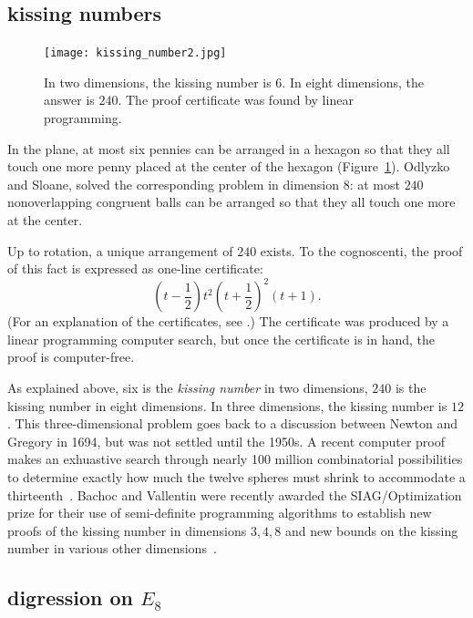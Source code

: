 \documentclass{llncs}
\begin{document}
\subsection{kissing numbers} %


\begin{figure}[h!]
  \centering
\texttt{[image: kissing\_number2.jpg]}
  \caption{In two dimensions, the kissing number is $6$. In eight dimensions, the answer is $240$.
   The proof certificate was found by linear programming.}
\label{fig:kissing}
\end{figure}


In the plane, at most six pennies can be arranged in a hexagon so that they
all touch one more penny placed at the center of the hexagon (Figure~\ref{fig:kissing}).  Odlyzko
and Sloane, solved the corresponding problem in dimension $8$: at most
$240$ nonoverlapping congruent balls can be arranged so that they all
touch one more at the center.  

 Up to rotation, a unique arrangement of
$240$ exists.  To the cognoscenti, the proof of this fact is expressed as one-line certificate:
\[
(t - \frac{1}{2})t^2(t + \frac{1}{2})^2 (t + 1).
\]
(For an explanation of the certificates, see \cite{PZ}.)
The certificate was produced by a linear programming computer search, but once
the certificate is in hand, the proof is computer-free.

As explained above, six is the {\it kissing number} in two dimensions,
$240$ is the kissing number in eight dimensions. In three dimensions,
the kissing number is $12$.  This three-dimensional problem goes back
to a discussion between Newton and Gregory in 1694, but was not
settled until the 1950s.  A recent computer proof makes an exhuastive
search through nearly 100 million combinatorial possibilities to
determine exactly how much the twelve spheres must shrink to
accommodate a thirteenth~\cite{Musin-Tarasov}.  Bachoc and Vallentin
were recently awarded the SIAG/Optimization prize for their use of
semi-definite programming algorithms to establish new proofs of the
kissing number in dimensions $3,4,8$ and new bounds on the kissing
number in various other dimensions~\cite{BV08}.



\subsection{digression on $E_8$}\label{sec:e8}
\end{document}
